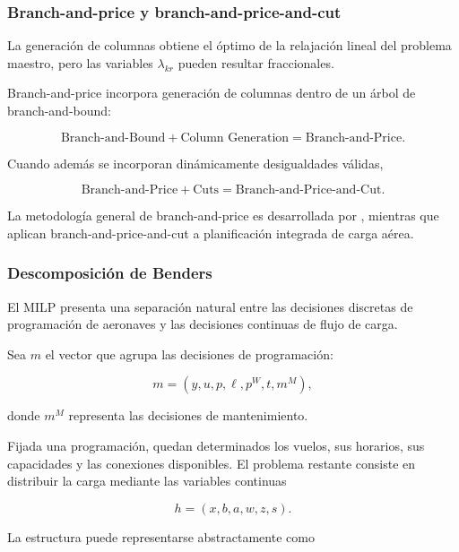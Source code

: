 \subsubsection{Branch-and-price y branch-and-price-and-cut}
\label{app:branch_price}

La generación de columnas obtiene el óptimo de la relajación lineal del problema maestro,
pero las variables $\lambda_{kr}$ pueden resultar fraccionales.

Branch-and-price incorpora generación de columnas dentro de un árbol de branch-and-bound:

\[
\boxed{
\text{Branch-and-Bound}
+
\text{Column Generation}
=
\text{Branch-and-Price}.
}
\]

Cuando además se incorporan dinámicamente desigualdades válidas,

\[
\boxed{
\text{Branch-and-Price}
+
\text{Cuts}
=
\text{Branch-and-Price-and-Cut}.
}
\]

La metodología general de branch-and-price es desarrollada por
, mientras que  aplican
branch-and-price-and-cut a planificación integrada de carga aérea.


\subsubsection{Descomposición de Benders}
\label{app:benders}

El MILP presenta una separación natural entre las decisiones discretas de programación de
aeronaves y las decisiones continuas de flujo de carga.

Sea $m$ el vector que agrupa las decisiones de programación:

\[
m=(y,u,p,\ell,p^W,t,m^M),
\]

donde $m^M$ representa las decisiones de mantenimiento.

Fijada una programación, quedan determinados los vuelos, sus horarios, sus capacidades y las
conexiones disponibles. El problema restante consiste en distribuir la carga mediante las
variables continuas

\[
h=(x,b,a,w,z,s).
\]

La estructura puede representarse abstractamente como

